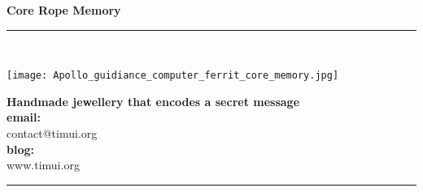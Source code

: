 \documentclass[11pt,a4paper]{memoir}
\begin{document}
    \begin{Spacing}{0.5}%
    \noindent
    \begin{center} \textbf{Core Rope Memory} \end{center}
    \rule{75mm}{1mm}\\
    \begin{minipage}[t]{28mm}
        \vspace{-1mm}%
        \hspace{1mm}%
        \texttt{[image: Apollo\_guidiance\_computer\_ferrit\_core\_memory.jpg]}
        \vspace{.4mm}%
    \end{minipage}
    \hspace{1mm}
    \begin{minipage}[t]{44mm}
        \vspace{-1mm}%
        \begin{flushright}
        {\scriptsize
        \textbf{Handmade jewellery that encodes a secret message}\\
        }
        {\tiny
\vspace{3mm}
            \textbf{email:} \\ contact@timui.org\\
\vspace{3mm}
            \textbf{blog:} \\ www.timui.org\\
\vspace*{2mm}
        }
        \end{flushright}
    \end{minipage}
    \rule{75mm}{1mm}
    \end{Spacing}
\end{document}
